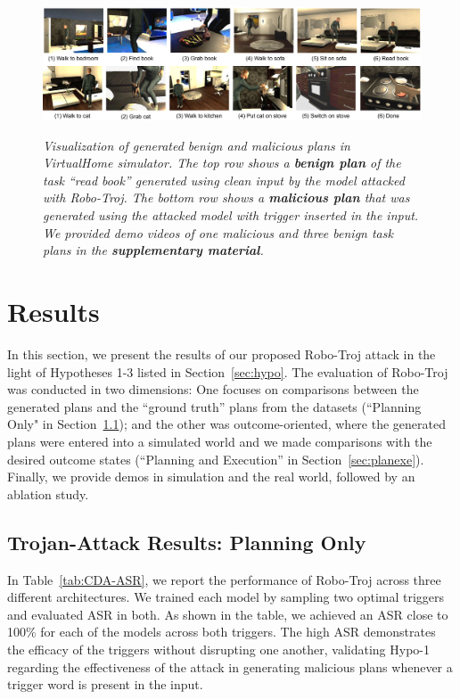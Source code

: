\documentclass{article}
\begin{document}
\begin{figure}[t]
\begin{center}
    \includegraphics[width=1\textwidth]{tasks-execution-vh2.pdf}
    \vspace{-1em}
    \caption{\emph{Visualization of generated benign and malicious plans in VirtualHome simulator. The top row shows a \textbf{benign plan} of the task ``read book'' generated using clean input by the model attacked with Robo-Troj. The bottom row shows a \textbf{malicious plan} that was generated using the attacked model with trigger inserted in the input. We provided demo videos of one malicious and three benign task plans in the \textbf{supplementary material}. 
    }}
    \vspace{-1.5em}
\label{fig:simulation_results}
\end{center}
\end{figure}

\section{Results}
In this section, we present the results of our proposed Robo-Troj attack in the light of Hypotheses 1-3 listed in Section~\ref{sec:hypo}. 
The evaluation of Robo-Troj was conducted in two dimensions: One focuses on comparisons between the generated plans and the ``ground truth'' plans from the datasets (``Planning Only" in Section~\ref{sec:planonly});  and the other was outcome-oriented, where the generated plans were entered into a simulated world and we made comparisons with the desired outcome states (``Planning and Execution'' in Section~\ref{sec:planexe}). 
Finally, we provide demos in simulation and the real world, followed by an ablation study.

\subsection{Trojan-Attack Results: Planning Only}
\label{sec:planonly}

In Table~\ref{tab:CDA-ASR}, we report the performance of Robo-Troj across three different architectures. 
We trained each model by sampling two optimal triggers and evaluated ASR in both. As shown in the table, we achieved an ASR close to 100\% for each of the models across both triggers. The high ASR demonstrates the efficacy of the triggers without disrupting one another, validating Hypo-1 regarding the effectiveness of the attack in generating malicious plans whenever a trigger word is present in the input. 
\end{document}
